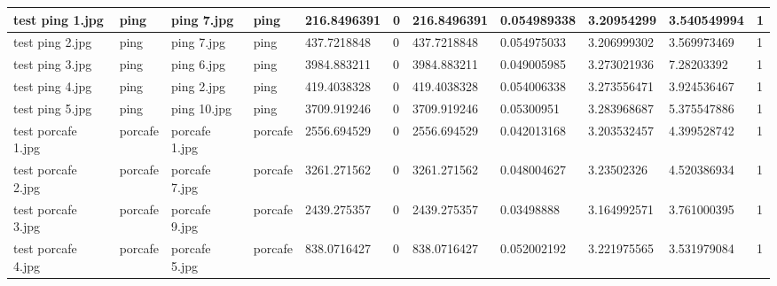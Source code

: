 \begin{landscape}
\begin{longtable}{|p{2cm}|p{1.5cm}|p{2cm}|p{1.5cm}|p{2cm}|p{1cm}|p{2cm}|p{2cm}|p{2cm}|p{2cm}|p{1cm}|}
		test ping 1.jpg      & ping             & ping 7.jpg            & ping                        & 216.8496391           & 0                       & 216.8496391                & 0.054989338           & 3.20954299            & 3.540549994              & 1                \\ \hline
		test ping 2.jpg      & ping             & ping 7.jpg            & ping                        & 437.7218848           & 0                       & 437.7218848                & 0.054975033           & 3.206999302           & 3.569973469              & 1                \\ \hline
		test ping 3.jpg      & ping             & ping 6.jpg            & ping                        & 3984.883211           & 0                       & 3984.883211                & 0.049005985           & 3.273021936           & 7.28203392               & 1                \\ \hline
		test ping 4.jpg      & ping             & ping 2.jpg            & ping                        & 419.4038328           & 0                       & 419.4038328                & 0.054006338           & 3.273556471           & 3.924536467              & 1                \\ \hline
		test ping 5.jpg      & ping             & ping 10.jpg           & ping                        & 3709.919246           & 0                       & 3709.919246                & 0.05300951            & 3.283968687           & 5.375547886              & 1                \\ \hline
		test porcafe 1.jpg   & porcafe          & porcafe 1.jpg         & porcafe                     & 2556.694529           & 0                       & 2556.694529                & 0.042013168           & 3.203532457           & 4.399528742              & 1                \\ \hline
		test porcafe 2.jpg   & porcafe          & porcafe 7.jpg         & porcafe                     & 3261.271562           & 0                       & 3261.271562                & 0.048004627           & 3.23502326            & 4.520386934              & 1                \\ \hline
		test porcafe 3.jpg   & porcafe          & porcafe 9.jpg         & porcafe                     & 2439.275357           & 0                       & 2439.275357                & 0.03498888            & 3.164992571           & 3.761000395              & 1                \\ \hline
		test porcafe 4.jpg   & porcafe          & porcafe 5.jpg         & porcafe                     & 838.0716427           & 0                       & 838.0716427                & 0.052002192           & 3.221975565           & 3.531979084              & 1                \\ \hline

\end{longtable}
\end{landscape}
